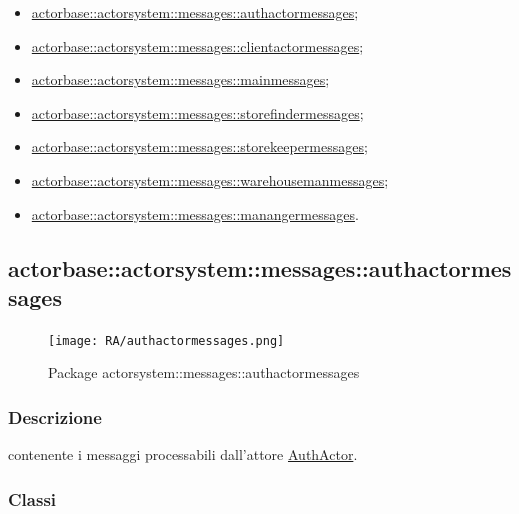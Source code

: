 \documentclass{scalatekids-article}
\begin{document}
\begin{itemize}
\item \hyperref[sec:actorbase::actorsystem::messages::authactormessages]{actorbase::actorsystem::messages::authactormessages};
\item \hyperref[sec:actorbase::actorsystem::messages::clientactormessages]{actorbase::actorsystem::messages::clientactormessages};
\item \hyperref[sec:actorbase::actorsystem::messages::mainmessages]{actorbase::actorsystem::messages::mainmessages};
\item \hyperref[sec:actorbase::actorsystem::messages::storefindermessages]{actorbase::actorsystem::messages::storefindermessages};
\item \hyperref[sec:actorbase::actorsystem::messages::storekeepermessages]{actorbase::actorsystem::messages::storekeepermessages};
\item \hyperref[sec:actorbase::actorsystem::messages::warehousemanmessages]{actorbase::actorsystem::messages::warehousemanmessages};
\item \hyperref[sec:actorbase::actorsystem::messages::warehousemanmessages]{actorbase::actorsystem::messages::manangermessages}.
\end{itemize}

\subsection{actorbase::actorsystem::messages::authactormessages}
\label{sec:actorbase::actorsystem::messages::authactormessages}

\begin{figure}[H]
  \begin{center}
    \texttt{[image: RA/authactormessages.png]}
    \caption{Package actorsystem::messages::authactormessages}
  \end{center}
\end{figure}

\subsubsection{Descrizione}
 contenente i messaggi processabili dall'attore \hyperref[sec:actorbase::actorsystem::actors::authactor::AuthActor]{AuthActor}.

\subsubsection{Classi}
\end{document}
